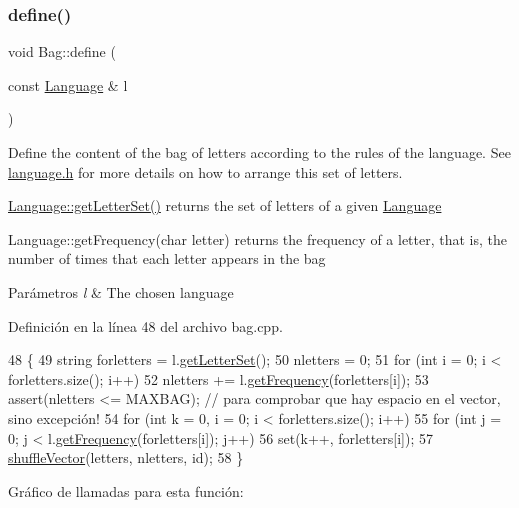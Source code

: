 \subsubsection{\texorpdfstring{define()}{define()}}
{\footnotesize\ttfamily void Bag\+::define (\begin{DoxyParamCaption}\item[{const \hyperlink{classLanguage}{Language} \&}]{l }\end{DoxyParamCaption})}



Define the content of the bag of letters according to the rules of the language. See \hyperlink{language_8h}{language.\+h} for more details on how to arrange this set of letters. 


\begin{DoxyItemize}
\item \hyperlink{classLanguage_ad72e0fe4a285a849d217a1b9251c79f1}{Language\+::get\+Letter\+Set()} returns the set of letters of a given \hyperlink{classLanguage}{Language}
\item Language\+::get\+Frequency(char letter) returns the frequency of a letter, that is, the number of times that each letter appears in the bag 
\begin{DoxyParams}{Parámetros}
{\em l} & The chosen language \\
\hline
\end{DoxyParams}

\end{DoxyItemize}

Definición en la línea 48 del archivo bag.\+cpp.


\begin{DoxyCode}
48                                   \{
49     \textcolor{keywordtype}{string} forletters = l.\hyperlink{classLanguage_ad72e0fe4a285a849d217a1b9251c79f1}{getLetterSet}();
50     nletters = 0;
51     \textcolor{keywordflow}{for} (\textcolor{keywordtype}{int} i = 0; i < forletters.size(); i++)
52         nletters += l.\hyperlink{classLanguage_ac727ac60a054ecd36e526fe93de8fc7f}{getFrequency}(forletters[i]);  
53     assert(nletters <= MAXBAG); \textcolor{comment}{// para comprobar que hay espacio en el vector, sino excepción!}
54     \textcolor{keywordflow}{for} (\textcolor{keywordtype}{int} k = 0, i = 0; i < forletters.size(); i++)
55         \textcolor{keywordflow}{for} (\textcolor{keywordtype}{int} j = 0; j < l.\hyperlink{classLanguage_ac727ac60a054ecd36e526fe93de8fc7f}{getFrequency}(forletters[i]); j++)
56             \textcolor{keyword}{set}(k++, forletters[i]);
57     \hyperlink{bag_8cpp_a93c24c436157bf4f753bd36d1e1d2e4a}{shuffleVector}(letters, nletters, \textcolor{keywordtype}{id});
58 \}
\end{DoxyCode}
Gráfico de llamadas para esta función\+:
\mbox{\label{classBag_a663748c811e0d45cebfa8ac13a1d9168}} 
